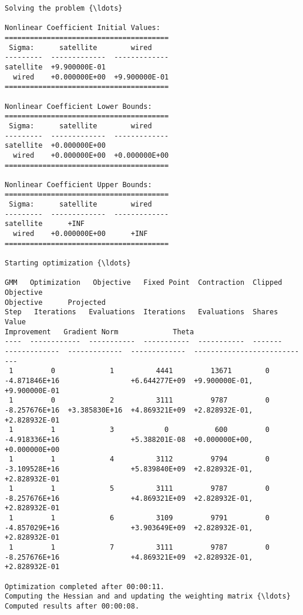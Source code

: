     \begin{Verbatim}[commandchars=\\\{\}]
Solving the problem {\ldots}

Nonlinear Coefficient Initial Values:
=======================================
 Sigma:      satellite        wired
---------  -------------  -------------
satellite  +9.900000E-01
  wired    +0.000000E+00  +9.900000E-01
=======================================

Nonlinear Coefficient Lower Bounds:
=======================================
 Sigma:      satellite        wired
---------  -------------  -------------
satellite  +0.000000E+00
  wired    +0.000000E+00  +0.000000E+00
=======================================

Nonlinear Coefficient Upper Bounds:
=======================================
 Sigma:      satellite        wired
---------  -------------  -------------
satellite      +INF
  wired    +0.000000E+00      +INF
=======================================

Starting optimization {\ldots}

GMM   Optimization   Objective   Fixed Point  Contraction  Clipped    Objective
Objective      Projected
Step   Iterations   Evaluations  Iterations   Evaluations  Shares       Value
Improvement   Gradient Norm             Theta
----  ------------  -----------  -----------  -----------  -------
-------------  -------------  -------------  ----------------------------
 1         0             1          4441         13671        0
-4.871846E+16                 +6.644277E+09  +9.900000E-01, +9.900000E-01
 1         0             2          3111         9787         0
-8.257676E+16  +3.385830E+16  +4.869321E+09  +2.828932E-01, +2.828932E-01
 1         1             3            0           600         0
-4.918336E+16                 +5.388201E-08  +0.000000E+00, +0.000000E+00
 1         1             4          3112         9794         0
-3.109528E+16                 +5.839840E+09  +2.828932E-01, +2.828932E-01
 1         1             5          3111         9787         0
-8.257676E+16                 +4.869321E+09  +2.828932E-01, +2.828932E-01
 1         1             6          3109         9791         0
-4.857029E+16                 +3.903649E+09  +2.828932E-01, +2.828932E-01
 1         1             7          3111         9787         0
-8.257676E+16                 +4.869321E+09  +2.828932E-01, +2.828932E-01

Optimization completed after 00:00:11.
Computing the Hessian and and updating the weighting matrix {\ldots}
Computed results after 00:00:08.


\end{Verbatim}

